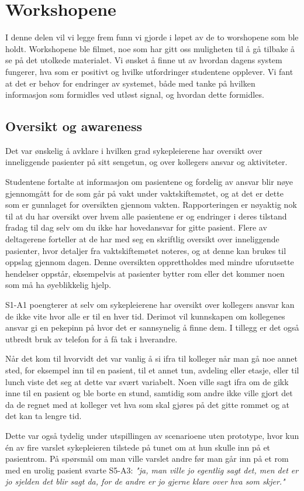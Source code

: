 \section{Workshopene}
\label{ws}

I denne delen vil vi legge frem funn vi gjorde i løpet av de to worshopene som ble holdt.  Workshopene ble filmet, noe som har gitt oss muligheten til å gå tilbake å se på det utolkede materialet. Vi ønsket å finne ut av hvordan dagens system fungerer, hva som er positivt og hvilke utfordringer studentene opplever. Vi fant at det er behov for endringer av systemet, både med tanke på hvilken informasjon som formidles ved utløst signal, og hvordan dette formidles.

\subsection{Oversikt og awareness}
Det var ønskelig å avklare i hvilken grad sykepleierene har oversikt over inneliggende pasienter på sitt sengetun, og over kollegers ansvar og aktiviteter.

\noindent
Studentene fortalte at informasjon om pasientene og fordelig av ansvar blir nøye gjennomgått for de som går på vakt under vaktskiftemøtet, og at det er dette som er gunnlaget for oversikten gjennom vakten. Rapporteringen er nøyaktig nok til at du har oversikt over hvem alle pasientene er og endringer i deres tilstand fradag til dag selv om du ikke har hovedansvar for gitte pasient. Flere av deltagerene forteller at de har med seg en skriftlig oversikt over inneliggende pasienter, hvor detaljer fra vaktskiftemøtet noteres, og at denne kan brukes til oppslag gjennom dagen. Denne oversikten opprettholdes med mindre uforutsette hendelser oppstår, eksempelvis at pasienter bytter rom eller det kommer noen som må ha øyeblikkelig hjelp. 

\noindent
S1-A1 poengterer at selv om sykepleierene har oversikt over kollegers ansvar kan de ikke vite hvor alle er til en hver tid. Derimot vil kunnskapen om kollegenes ansvar gi en pekepinn på hvor det er sannsynelig å finne dem. I tillegg er det også utbredt bruk av telefon for å få tak i hverandre. 

\noindent
Når det kom til hvorvidt det var vanlig å si ifra til kolleger når man gå noe annet sted, for eksempel inn til en pasient, til et annet tun, avdeling eller etasje, eller til lunch viste det seg at dette var svært variabelt. Noen ville sagt ifra om de gikk inne til en pasient og ble borte en stund, samtidig som andre ikke ville gjort det da de regnet med at kolleger vet hva som skal gjøres på det gitte rommet og at det kan ta lengre tid.

Dette var også tydelig under utspillingen av scenarioene uten prototype, hvor kun én av fire varslet sykepleieren tilstede på tunet om at hun skulle inn på et pasientrom. På spørsmål om man ville varslet andre før man går inn på et rom med en urolig pasient svarte S5-A3: \emph{"ja, man ville jo egentlig sagt det, men det er jo sjelden det blir sagt da, for de andre er jo gjerne klare over hva som skjer."}
